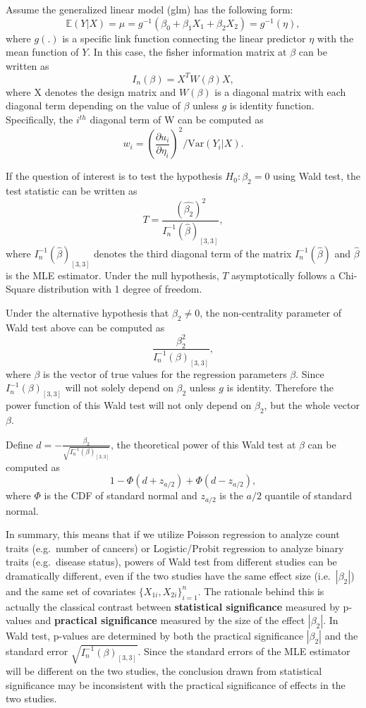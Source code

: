 \documentclass[
]{article}
\begin{document}
Assume the generalized linear model (glm) has the following form:
\[\mathbb{E}(Y|X) = \mu = g^{-1}(\beta_0 + \beta_1 X_1 + \beta_2X_2) = g^{-1}(\eta),\]
where \(g(.)\) is a specific link function connecting the linear
predictor \(\eta\) with the mean function of \(Y\). In this case, the
fisher information matrix at \(\beta\) can be written as
\[I_n(\beta) = X^TW(\beta) X,\] where X denotes the design matrix and
\(W(\beta)\) is a diagonal matrix with each diagonal term depending on
the value of \(\beta\) unless \(g\) is identity function. Specifically,
the \(i^{th}\) diagonal term of W can be computed as
\[w_i=(\frac{\partial u_i}{\partial\eta_i})^2/\text{Var}(Y_i|X).\]

If the question of interest is to test the hypothesis \(H_0: \beta_2=0\)
using Wald test, the test statistic can be written as
\[T = \frac{(\hat{\beta_2})^2}{I_n^{-1}(\hat{\beta})_{[3,3]}},\] where
\(I_n^{-1}(\hat{\beta})_{[3,3]}\) denotes the third diagonal term of the
matrix \(I_n^{-1}(\hat{\beta})\) and \(\hat{\beta}\) is the MLE
estimator. Under the null hypothesis, \(T\) asymptotically follows a
Chi-Square distribution with 1 degree of freedom.

Under the alternative hypothesis that \(\beta_2 \neq 0\), the
non-centrality parameter of Wald test above can be computed as
\[\frac{\beta_2^2}{I_n^{-1}(\beta)_{[3,3]}},\] where \(\beta\) is the
vector of true values for the regression parameters \(\beta\). Since
\(I_n^{-1}(\beta)_{[3,3]}\) will not solely depend on \(\beta_2\) unless
\(g\) is identity. Therefore the power function of this Wald test will
not only depend on \(\beta_2\), but the whole vector \(\beta\).

Define \(d=-\frac{\beta_2}{\sqrt{I_n^{-1}(\beta)_{[3,3]}}}\), the
theoretical power of this Wald test at \(\beta\) can be computed as
\[1-\Phi(d+z_{a/2})+\Phi(d-z_{a/2}),\] where \(\Phi\) is the CDF of
standard normal and \(z_{a/2}\) is the \(a/2\) quantile of standard
normal.

In summary, this means that if we utilize Poisson regression to analyze
count traits (e.g.~number of cancers) or Logistic/Probit regression to
analyze binary traits (e.g.~disease status), powers of Wald test from
different studies can be dramatically different, even if the two studies
have the same effect size (i.e.~\(|\beta_2|\)) and the same set of
covariates \(\{X_{1i},X_{2i}\}_{i=1}^n\). The rationale behind this is
actually the classical contrast between
\textbf{statistical significance} measured by p-values and
\textbf{practical significance} measured by the size of the effect
\(|\beta_2|\). In Wald test, p-values are determined by both the
practical significance \(|\beta_2|\) and the standard error
\(\sqrt{I_n^{-1}(\beta)_{[3,3]}}\). Since the standard errors of the MLE
estimator will be different on the two studies, the conclusion drawn
from statistical significance may be inconsistent with the practical
significance of effects in the two studies.
\end{document}
